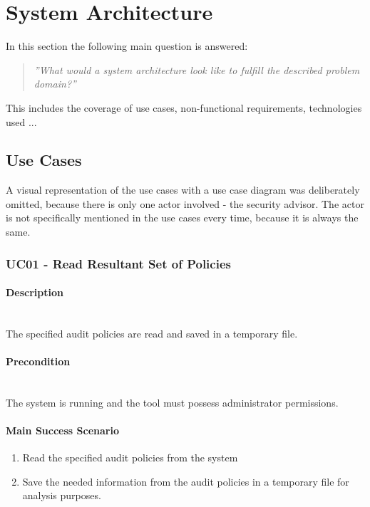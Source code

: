\section{System Architecture}
In this section the following main question is answered: 
\begin{quotation}
    \textit{''What would a system architecture look like to fulfill the described problem domain?''}
\end{quotation}
This includes the coverage of use cases, non-functional requirements, technologies used ...

\subsection{Use Cases}
A visual representation of the use cases with a use case diagram was deliberately omitted, because there is only one actor involved - the security advisor. The actor is not specifically mentioned in the use cases every time, because it is always the same.

\subsubsection{UC01 - Read Resultant Set of Policies}
\begin{tcolorbox}
    \paragraph{Description} \ \\
    The specified audit policies are read and saved in a temporary file.
    \ \\
    \paragraph{Precondition} \ \\
    The system is running and the tool must possess administrator permissions.
    \ \\
    \paragraph{Main Success Scenario} 
    \begin{enumerate}
        \item Read the specified audit policies from the system
        \item Save the needed information from the audit policies in a temporary file for analysis purposes.
    \end{enumerate}   
\end{tcolorbox}

